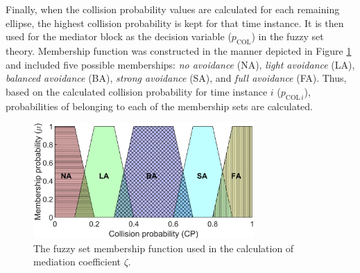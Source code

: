 Finally, when the collision probability values are calculated for each remaining ellipse, the highest collision probability is kept for that time instance. It is then used for the mediator block as the decision variable ($p_{\textrm{COL}}$) in the fuzzy set theory. Membership function was constructed in the manner depicted in Figure \ref{Fig:Fuzzy} and included five possible memberships:  \emph{no avoidance} (NA), \emph{light avoidance} (LA), \emph{balanced avoidance} (BA), \emph{strong avoidance} (SA), and \emph{full avoidance} (FA). Thus, based on the calculated collision probability for time instance $i$ ($p_{\textrm{COL}\,i}$), probabilities of belonging to each of the membership sets are calculated. 

\begin{figure}
    \centering
    \includegraphics[width=0.75\textwidth]{slike/fuzzy_member.eps}
    \caption{The fuzzy set membership function used in the calculation of mediation coefficient $\zeta$.} 
    \label{Fig:Fuzzy}
\end{figure}

